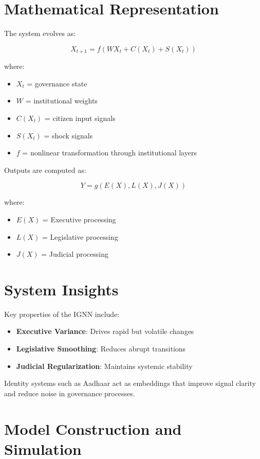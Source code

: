 \documentclass[12pt]{article}
\begin{document}
\section{Mathematical Representation}

The system evolves as:

\[
X_{t+1} = f(WX_t + C(X_t) + S(X_t))
\]

where:

\begin{itemize}
\item $X_t$ = governance state
\item $W$ = institutional weights
\item $C(X_t)$ = citizen input signals
\item $S(X_t)$ = shock signals
\item $f$ = nonlinear transformation through institutional layers
\end{itemize}

Outputs are computed as:

\[
Y = g(E(X), L(X), J(X))
\]

where:

\begin{itemize}
\item $E(X)$ = Executive processing
\item $L(X)$ = Legislative processing
\item $J(X)$ = Judicial processing
\end{itemize}

\section{System Insights}

Key properties of the IGNN include:

\begin{itemize}
\item \textbf{Executive Variance}: Drives rapid but volatile changes
\item \textbf{Legislative Smoothing}: Reduces abrupt transitions
\item \textbf{Judicial Regularization}: Maintains systemic stability
\end{itemize}

Identity systems such as Aadhaar act as embeddings that improve signal clarity and reduce noise in governance processes.

\section{Model Construction and Simulation}
\end{document}
